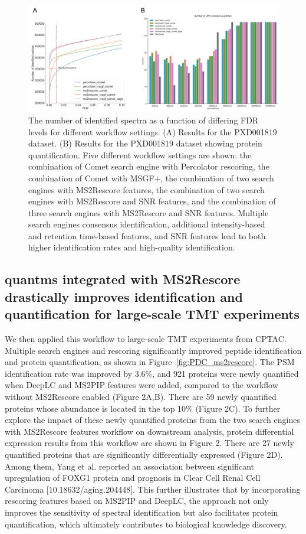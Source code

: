 \documentclass[12pt]{article}
\begin{document}
\begin{figure}[h!]
	\centering
	\includegraphics[width=1\textwidth]{figures//PXD001819.jpg}
	\caption{The number of identified spectra as a function of differing FDR levels for different workflow settings. (A) Results for the PXD001819 dataset. (B) Results for the PXD001819 dataset showing protein quantification. Five different workflow settings are shown: the combination of Comet search engine with Percolator rescoring, the combination of Comet with MSGF+, the combination of two search engines with MS2Rescore features, the combination of two search engines with MS2Rescore and SNR features, and the combination of three search engines with MS2Rescore and SNR features. Multiple search engines consensus identification, additional intensity-based and retention time-based features, and SNR features lead to both higher identification rates and high-quality identification.}
	\label{fig:PXD001819_ms2rescore_pic}
\end{figure}

\subsection{quantms integrated with MS2Rescore drastically improves identification and quantification for large-scale TMT experiments}
We then applied this workflow to large-scale TMT experiments from CPTAC. Multiple search engines and rescoring significantly improved peptide identification and protein quantification, as shown in Figure~\ref{fig:PDC_ms2rescore}. The PSM identification rate was improved by 3.6\%, and 921 proteins were newly quantified when DeepLC and MS2PIP features were added, compared to the workflow without MS2Rescore enabled (Figure 2A,B). There are 59 newly quantified proteins whose abundance is located in the top 10\% (Figure 2C). To further explore the impact of these newly quantified proteins from the two search engines with MS2Rescore features workflow on downstream analysis, protein differential expression results from this workflow are shown in Figure 2. There are 27 newly quantified proteins that are significantly differentially expressed (Figure 2D). Among them, Yang et al. reported an association between significant upregulation of FOXG1 protein and prognosis in Clear Cell Renal Cell Carcinoma [10.18632/aging.204448]. This further illustrates that by incorporating rescoring features based on MS2PIP and DeepLC, the approach not only improves the sensitivity of spectral identification but also facilitates protein quantification, which ultimately contributes to biological knowledge discovery.
\end{document}
